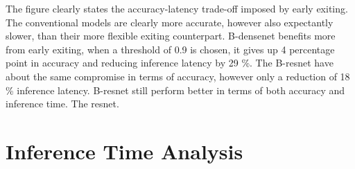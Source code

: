 The figure clearly states the accuracy-latency trade-off imposed by early exiting. The conventional models are clearly more accurate, however also expectantly slower, than their more flexible exiting counterpart. B-\gls{densenet} benefits more from early exiting, when a threshold of 0.9 is chosen, it gives up 4 percentage point in accuracy and reducing inference latency by 29 \%. The B-\gls{resnet} have about the same compromise in terms of accuracy, however only a reduction of 18 \% inference latency. B-\gls{resnet} still perform better in terms of both accuracy and inference time. The \gls{resnet}. 

  \begin{figure}
	\captionsetup[subfigure]{justification=centering}
	\centering
	\caption[]{}
\end{figure}

\section{Inference Time Analysis}

